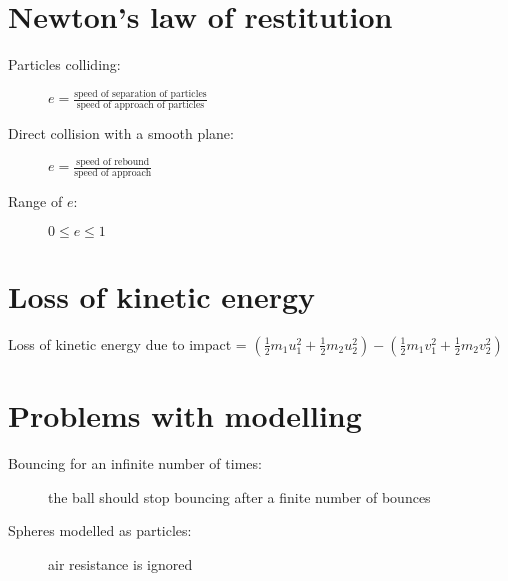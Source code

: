 \section{Newton's law of restitution}
\begin{description}
    \item[Particles colliding:] $e=\frac{\text{speed of separation of particles}}{\text{speed of approach of particles}}$
    \item[Direct collision with a smooth plane:] $e=\frac{\text{speed of rebound}}{\text{speed of approach}}$
    \item[Range of $e$:] $0 \leq e \leq 1$
\end{description}

\section{Loss of kinetic energy}
Loss of kinetic energy due to impact = $(\frac{1}{2}m_1u_1^2+\frac{1}{2}m_2u_2^2)-(\frac{1}{2}m_1v_1^2+\frac{1}{2}m_2v_2^2)$

\section{Problems with modelling} %
\begin{description}
    \item[Bouncing for an infinite number of times:] the ball should stop bouncing after a finite number of bounces
    \item[Spheres modelled as particles:] air resistance is ignored
\end{description}